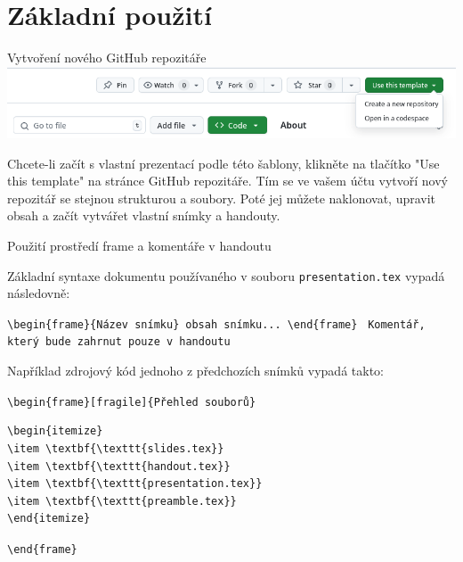 \section{Základní použití}


\begin{frame}[fragile]{Vytvoření nového GitHub repozitáře}
\includegraphics[width=\textwidth]{img/template-use.png}
\end{frame}

Chcete-li začít s vlastní prezentací podle této šablony, klikněte na tlačítko "Use this template" na stránce GitHub repozitáře. Tím se ve vašem účtu vytvoří nový repozitář se stejnou strukturou a soubory. Poté jej můžete naklonovat, upravit obsah a začít vytvářet vlastní snímky a handouty.

\begin{frame}[fragile]{Použití prostředí frame a komentáře v handoutu}

\begin{block}{}
Základní syntaxe dokumentu používaného v souboru \verb|presentation.tex| vypadá následovně:
\end{block}

\begin{likeverbatim}\verb|\begin{frame}{Název snímku}|\
\verb|obsah snímku...|\
\verb|\end|\verb|{frame}|\
\vspace{1em}
\verb|Komentář, který bude zahrnut pouze v handoutu|
\end{likeverbatim}

\end{frame}

Například zdrojový kód jednoho z předchozích snímků vypadá takto:

\verb|\begin|\verb|{frame}[fragile]{Přehled souborů}|
\begin{verbatim}
\begin{itemize}
\item \textbf{\texttt{slides.tex}}
\item \textbf{\texttt{handout.tex}}
\item \textbf{\texttt{presentation.tex}}
\item \textbf{\texttt{preamble.tex}}
\end{itemize}
\end{verbatim}
\verb|\end|\verb|{frame}|


